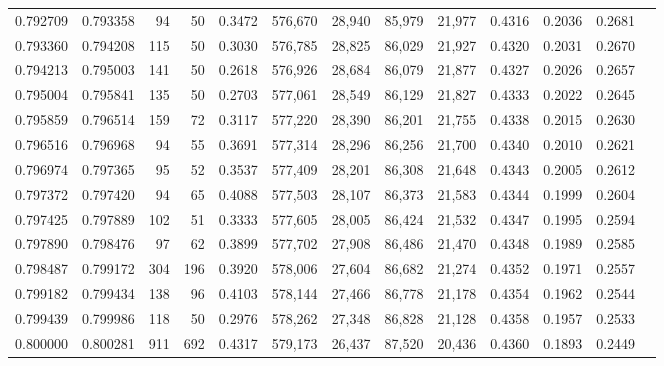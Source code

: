 \begin{tabular}{rrrrrrrrrrrrr}
0.792709 & 0.793358 &    94 &  50 &                                     0.3472 & 576,670 &  28,940 &  85,979 &  21,977 & 0.4316 & 0.2036 & 0.2681 \\
0.793360 & 0.794208 &   115 &  50 &                                     0.3030 & 576,785 &  28,825 &  86,029 &  21,927 & 0.4320 & 0.2031 & 0.2670 \\
0.794213 & 0.795003 &   141 &  50 &                                     0.2618 & 576,926 &  28,684 &  86,079 &  21,877 & 0.4327 & 0.2026 & 0.2657 \\
0.795004 & 0.795841 &   135 &  50 &                                     0.2703 & 577,061 &  28,549 &  86,129 &  21,827 & 0.4333 & 0.2022 & 0.2645 \\
0.795859 & 0.796514 &   159 &  72 &                                     0.3117 & 577,220 &  28,390 &  86,201 &  21,755 & 0.4338 & 0.2015 & 0.2630 \\
0.796516 & 0.796968 &    94 &  55 &                                     0.3691 & 577,314 &  28,296 &  86,256 &  21,700 & 0.4340 & 0.2010 & 0.2621 \\
0.796974 & 0.797365 &    95 &  52 &                                     0.3537 & 577,409 &  28,201 &  86,308 &  21,648 & 0.4343 & 0.2005 & 0.2612 \\
0.797372 & 0.797420 &    94 &  65 &                                     0.4088 & 577,503 &  28,107 &  86,373 &  21,583 & 0.4344 & 0.1999 & 0.2604 \\
0.797425 & 0.797889 &   102 &  51 &                                     0.3333 & 577,605 &  28,005 &  86,424 &  21,532 & 0.4347 & 0.1995 & 0.2594 \\
0.797890 & 0.798476 &    97 &  62 &                                     0.3899 & 577,702 &  27,908 &  86,486 &  21,470 & 0.4348 & 0.1989 & 0.2585 \\
0.798487 & 0.799172 &   304 & 196 &                                     0.3920 & 578,006 &  27,604 &  86,682 &  21,274 & 0.4352 & 0.1971 & 0.2557 \\
0.799182 & 0.799434 &   138 &  96 &                                     0.4103 & 578,144 &  27,466 &  86,778 &  21,178 & 0.4354 & 0.1962 & 0.2544 \\
0.799439 & 0.799986 &   118 &  50 &                                     0.2976 & 578,262 &  27,348 &  86,828 &  21,128 & 0.4358 & 0.1957 & 0.2533 \\
0.800000 & 0.800281 &   911 & 692 &                                     0.4317 & 579,173 &  26,437 &  87,520 &  20,436 & 0.4360 & 0.1893 & 0.2449 \\

\end{tabular}

